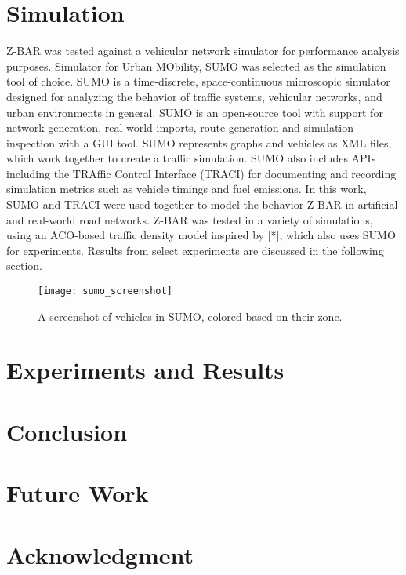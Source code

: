 \documentclass[conference]{IEEEtran}
\begin{document}
\section{Simulation}

Z-BAR was tested against a vehicular network simulator for performance analysis purposes. Simulator for Urban MObility, SUMO was selected as the simulation tool of choice. SUMO is a time-discrete, space-continuous microscopic simulator designed for analyzing the behavior of traffic systems, vehicular networks, and urban environments in general. SUMO is an open-source tool with support for network generation, real-world imports, route generation and simulation inspection with a GUI tool. SUMO represents graphs and vehicles as XML files, which work together to create a traffic simulation. SUMO also includes APIs including the TRAffic Control Interface (TRACI) for documenting and recording simulation metrics such as vehicle timings and fuel emissions. In this work, SUMO and TRACI were used together to model the behavior Z-BAR in artificial and real-world road networks. Z-BAR was tested in a variety of simulations, using an ACO-based traffic density model inspired by [*], which also uses SUMO for experiments. Results from select experiments are discussed in the following section.

\begin{figure}[h]
\caption{A screenshot of vehicles in SUMO, colored based on their zone.}
\centering
\texttt{[image: sumo\_screenshot]}
\end{figure}

\section{Experiments and Results} %

\section{Conclusion} %

\section{Future Work} %

\section*{Acknowledgment}

\begin{thebibliography}{1}
\bibitem{}
\end{thebibliography}
\end{document}
